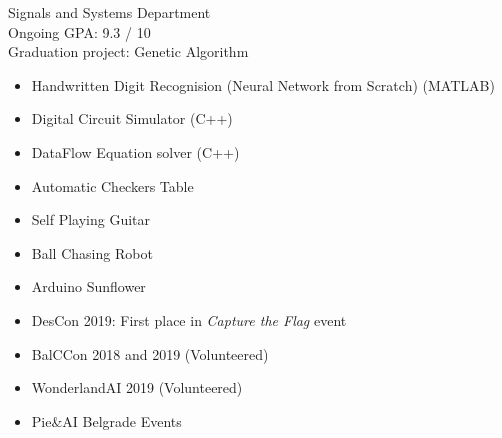


Signals and Systems Department\\
Ongoing GPA: 9.3 / 10
\\
\smallskip
{}
Graduation project: Genetic Algorithm








    \begin{itemize}
        \item Handwritten Digit Recognision (Neural Network from Scratch) (MATLAB)
        \item Digital Circuit Simulator (C++)
        \item DataFlow Equation solver (C++)
    \end{itemize}

    \begin{itemize}
        \item Automatic Checkers Table
        \item Self Playing Guitar
        \item Ball Chasing Robot
        \item Arduino Sunflower
    \end{itemize}
    
    
    \begin{itemize}
        \item DesCon 2019: First place in \textit{Capture the Flag} event
        \item BalCCon 2018 and 2019 (Volunteered)
        \item WonderlandAI 2019 (Volunteered)
        \item Pie\&AI Belgrade Events
    \end{itemize}
    
